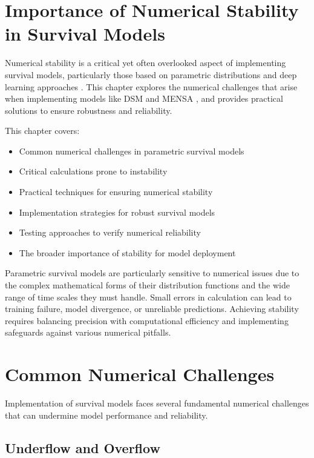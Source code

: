 \section{Importance of Numerical Stability in Survival Models}

Numerical stability is a critical yet often overlooked aspect of implementing survival models, particularly those based on parametric distributions and deep learning approaches \parencite{goldberg1991,hanin2022}. This chapter explores the numerical challenges that arise when implementing models like DSM \parencite{nagpal2021dsm} and MENSA \parencite{zhong2021}, and provides practical solutions to ensure robustness and reliability.

\begin{notebox}[title=Chapter Overview]
This chapter covers:
\begin{itemize}
    \item Common numerical challenges in parametric survival models
    \item Critical calculations prone to instability
    \item Practical techniques for ensuring numerical stability
    \item Implementation strategies for robust survival models
    \item Testing approaches to verify numerical reliability
    \item The broader importance of stability for model deployment
\end{itemize}
\end{notebox}

Parametric survival models are particularly sensitive to numerical issues due to the complex mathematical forms of their distribution functions and the wide range of time scales they must handle. Small errors in calculation can lead to training failure, model divergence, or unreliable predictions. Achieving stability requires balancing precision with computational efficiency and implementing safeguards against various numerical pitfalls.

\section{Common Numerical Challenges}

Implementation of survival models faces several fundamental numerical challenges that can undermine model performance and reliability.

\subsection{Underflow and Overflow}

